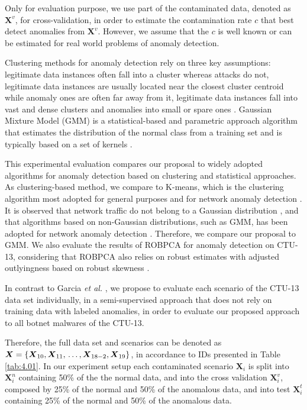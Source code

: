 Only for evaluation purpose, we use part of the contaminated data, denoted as $\textbf{X}^v$, for cross-validation, in order to estimate the contamination rate $c$ that best detect anomalies from $\textbf{X}^v$. However, we assume that the $c$ is well known or can be estimated for real world problems of anomaly detection.

Clustering methods for anomaly detection rely on three key assumptions: legitimate data instances often fall into a cluster whereas attacks do not, legitimate data instances are usually located near the closest cluster centroid while anomaly ones are often far away from it, legitimate data instances fall into vast and dense clusters and anomalies into small or spare ones \cite{ahmed2016survey, moustafa2019holistic}. Gaussian Mixture Model (GMM) is a statistical-based and parametric approach algorithm that estimates the distribution of the normal class from a training set and is typically based on a set of kernels \cite{moustafa2019holistic}.

This experimental evaluation compares our proposal to widely adopted algorithms for anomaly detection based on clustering and statistical approaches. As clustering-based method, we compare to K-means, which is the clustering algorithm most adopted for general purposes and for network anomaly detection \cite{gaddam2007kmeans,moustafa2019holistic}. It is observed that network traffic do not belong to a Gaussian distribution \cite{benson2010network,moustafa2019holistic}, and that algorithms based on non-Gaussian distributions, such as GMM, has been adopted for network anomaly detection \cite{moustafa2019holistic}. Therefore, we compare our proposal to GMM. We also evaluate the results of ROBPCA for anomaly detection on CTU-13, considering that ROBPCA also relies on robust estimates with adjusted outlyingness based on robust skewness \cite{hubert2009robustskewed}. 

In contrast to Garcia \emph{et al.} \cite{garcia2014empirical}, we propose to evaluate each scenario of the CTU-13 data set individually, in a semi-supervised approach that does not rely on training data with labeled anomalies, in order to evaluate our proposed approach to all botnet malwares of the CTU-13. 

Therefore, the full data set and scenarios can be denoted as $\boldsymbol{X} = \{\boldsymbol{X}_{10}, \boldsymbol{X}_{11}, \\\ldots , \boldsymbol{X}_{18-2}, \boldsymbol{X}_{19}\}$, in accordance to IDs presented in Table \ref{tab:4.01}. In our experiment setup each contaminated scenario $\boldsymbol{X}_i$ is split into $\boldsymbol{X}_i^n$ containing 50\% of the the normal data, and into the cross validation $\boldsymbol{X}_i^v$, composed by 25\% of the normal and 50\% of the anomalous data, and into test $\boldsymbol{X}_i^t$ containing 25\% of the normal and 50\% of the anomalous data. 

